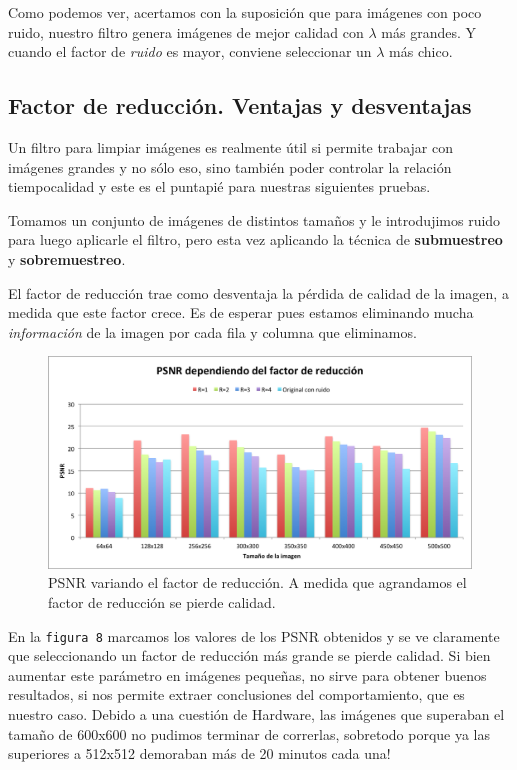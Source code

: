 \documentclass[a4paper]{article}
\begin{document}
Como podemos ver, acertamos con la suposición que para imágenes con poco ruido, nuestro filtro genera imágenes de mejor calidad con $\lambda$ más grandes. Y cuando el factor de \textit{ruido} es mayor, conviene seleccionar un $\lambda$ más chico.

\subsection{Factor de reducción. Ventajas y desventajas}
Un filtro para limpiar imágenes es realmente útil si permite trabajar con imágenes grandes y no sólo eso, sino también poder controlar la relación tiempo\/calidad y este es el puntapié para nuestras siguientes pruebas.

Tomamos un conjunto de imágenes de distintos tamaños y le introdujimos ruido para luego aplicarle el filtro, pero esta vez aplicando la técnica de \textbf{submuestreo} y \textbf{sobremuestreo}.

El factor de reducción trae como desventaja la pérdida de calidad de la imagen, a medida que este factor crece. Es de esperar pues estamos eliminando mucha \textit{información} de la imagen por cada fila y columna que eliminamos.

\begin{figure}[H]
  \centering
  \includegraphics[scale=0.8]{graficos/PSNR_factor_reduccion.png}
  \caption{ PSNR variando el factor de reducción. A medida que agrandamos el factor de reducción se pierde calidad. }
\end{figure}

En la \texttt{figura 8} marcamos los valores de los PSNR obtenidos y se ve claramente que seleccionando un factor de reducción más grande se pierde calidad. Si bien aumentar este parámetro en imágenes pequeñas, no sirve para obtener buenos resultados, si nos permite extraer conclusiones del comportamiento, que es nuestro caso.
Debido a una cuestión de Hardware, las imágenes que superaban el tamaño de 600x600 no pudimos terminar de correrlas, sobretodo porque ya las superiores a 512x512 demoraban más de 20 minutos cada una!
\end{document}

